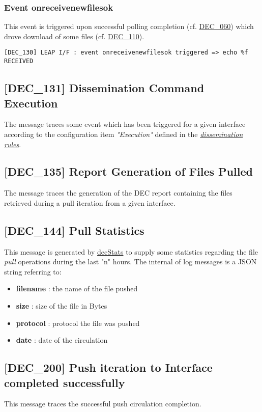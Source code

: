 \documentclass[dec_sum_main.tex]{subfiles}
\begin{document}
\subsubsection{Event onreceivenewfilesok}
This event is triggered upon successful polling completion (cf. \hyperref[DEC060]{DEC\_060}) which drove download of some files (cf. \hyperref[DEC110]{DEC\_110}).
\begin{verbatim}
[DEC_130] LEAP I/F : event onreceivenewfilesok triggered => echo %f RECEIVED
\end{verbatim}

\subsection{[DEC\_131] Dissemination Command Execution }
The message traces some event which has been triggered for a given interface according to the configuration item \textit{"Execution"} defined in the \hyperref[Dissemination rules]{\textit{dissemination rules}}.

\label{DEC135}
\subsection{[DEC\_135] Report Generation of Files Pulled}
The message traces the generation of the DEC report containing the files retrieved during a pull iteration from a given interface.

\label{DEC144}
\subsection{[DEC\_144] Pull Statistics}
This message is generated by \hyperref[decStats]{decStats} to supply some statistics regarding the file \textit{pull} operations during the last "n" hours.\newline
The internal of log messages is a JSON string referring to:
\begin{itemize}
	\item \textbf{filename} : the name of the file pushed
	\item \textbf{size} : size of the file in Bytes
	\item \textbf{protocol} : protocol the file was pushed
	\item \textbf{date} : date of the circulation
\end{itemize}

\label{DEC200}
\subsection{[DEC\_200] Push iteration to Interface completed successfully}
This message traces the successful push circulation completion.
\end{document}

